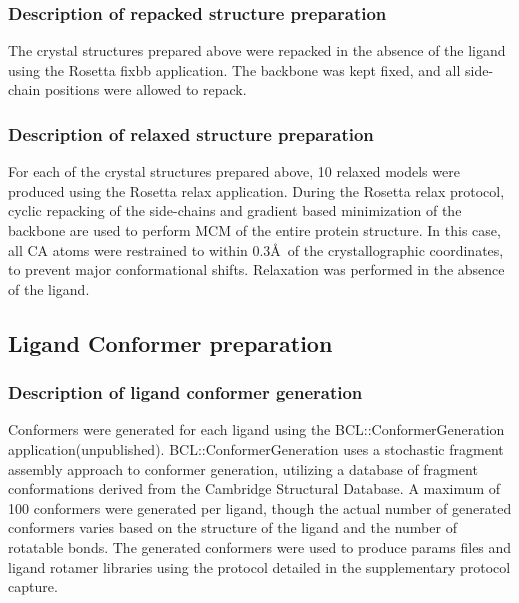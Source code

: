 \subsubsection{Description of repacked structure preparation}
The crystal structures prepared above were repacked in the absence of the ligand using the Rosetta fixbb application.
The backbone was kept fixed, and all side-chain positions were allowed to repack\citep{Kortemme:2004ia}.

\subsubsection{Description of relaxed structure preparation}
For each of the crystal structures prepared above, 10 relaxed models were produced using the Rosetta relax application.
During the Rosetta relax protocol, cyclic repacking of the side-chains and gradient based minimization of the backbone are used to perform MCM of the entire protein structure.
In this case, all CA atoms were restrained to within 0.3\AA\ of the crystallographic coordinates, to prevent major conformational shifts.
Relaxation was performed in the absence of the ligand.

\subsection{Ligand Conformer preparation}
\subsubsection{Description of ligand conformer generation}

Conformers were generated for each ligand using the BCL::ConformerGeneration application(unpublished).
BCL::ConformerGeneration uses a stochastic fragment assembly approach to conformer generation, utilizing a database of fragment conformations derived from the Cambridge Structural Database. 
A maximum of 100 conformers were generated per ligand, though the actual number of generated conformers varies based on the structure of the ligand and the number of rotatable bonds. The generated conformers were used to produce params files and ligand rotamer libraries using the protocol detailed in the supplementary protocol capture.
